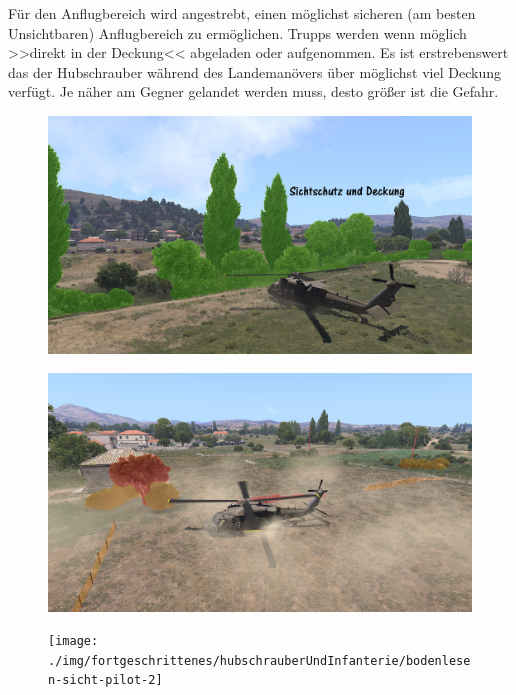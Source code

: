 	Für den Anflugbereich wird angestrebt, einen möglichst sicheren (am besten Unsichtbaren) Anflugbereich zu ermöglichen. Trupps werden wenn möglich >>direkt in der Deckung<< abgeladen oder aufgenommen. Es ist erstrebenswert das der Hubschrauber während des Landemanövers über möglichst viel Deckung verfügt. Je näher am Gegner gelandet werden muss, desto größer ist die Gefahr.
	\begin{figure}[htbp]
		\centering
		\includegraphics[width=0.95\linewidth]{./img/fortgeschrittenes/hubschrauberUndInfanterie/verdeckte-landung}
	\end{figure}	
	\begin{figure}[htbp]
		\centering
		\includegraphics[width=0.95\linewidth]{./img/fortgeschrittenes/hubschrauberUndInfanterie/bodenlesen-sicht-pilot}
	\end{figure}
	\begin{figure}[htbp]
		\centering
		\texttt{[image: ./img/fortgeschrittenes/hubschrauberUndInfanterie/bodenlesen-sicht-pilot-2]}
	\end{figure}
	
